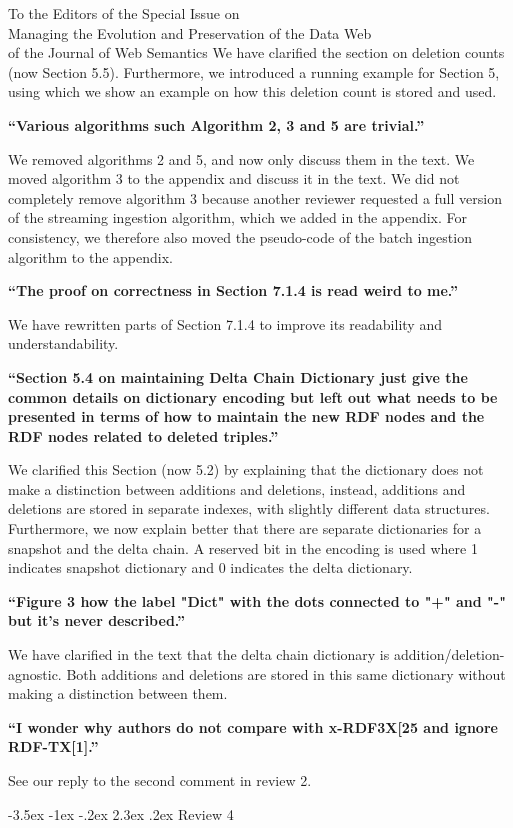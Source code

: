 \documentclass{letter}
\makeatletter
\newcounter{section}
\newcommand\section{\@startsection {section}{1}{\z@}%
                                   {-3.5ex \@plus -1ex \@minus -.2ex}%
                                   {2.3ex \@plus.2ex}%
                                   {\normalfont\Large\bfseries}}
\makeatother
\begin{document}
\begin{letter}{To the Editors of the Special Issue on\\Managing the Evolution and Preservation of the Data Web\\of the Journal of Web Semantics}
We have clarified the section on deletion counts (now Section 5.5).
Furthermore, we introduced a running example for Section 5,
using which we show an example on how this deletion count is stored and used.

\textbf{\enquote{Various algorithms such Algorithm 2, 3 and 5 are trivial.}}

We removed algorithms 2 and 5, and now only discuss them in the text.
We moved algorithm 3 to the appendix and discuss it in the text.
We did not completely remove algorithm 3 because another reviewer requested
a full version of the streaming ingestion algorithm, which we added in the appendix.
For consistency, we therefore also moved the pseudo-code of the batch ingestion algorithm to the appendix.

\textbf{\enquote{The proof on correctness in Section 7.1.4 is read weird to me.}}

We have rewritten parts of Section 7.1.4 to improve its readability and understandability.

\textbf{\enquote{Section 5.4 on maintaining Delta Chain Dictionary just give the common details on dictionary encoding but left out what needs to be presented in terms of how to maintain the new RDF nodes and the RDF nodes related to deleted triples.}}

We clarified this Section (now 5.2) by explaining that the dictionary does not make a distinction between additions and deletions,
instead, additions and deletions are stored in separate indexes, with slightly different data structures.
Furthermore, we now explain better that there are separate dictionaries for a snapshot and the delta chain.
A reserved bit in the encoding is used where 1 indicates snapshot dictionary and 0 indicates the delta dictionary.

\textbf{\enquote{Figure 3 how the label "Dict" with the dots connected to "+" and "-" but it's never described.}}

We have clarified in the text that the delta chain dictionary is addition/deletion-agnostic.
Both additions and deletions are stored in this same dictionary without making a distinction between them.

\textbf{\enquote{I wonder why authors do not compare with x-RDF3X[25 and ignore RDF-TX[1].}}

See our reply to the second comment in review 2.

\pagebreak
\section{Review 4}


\end{letter}
\end{document}
